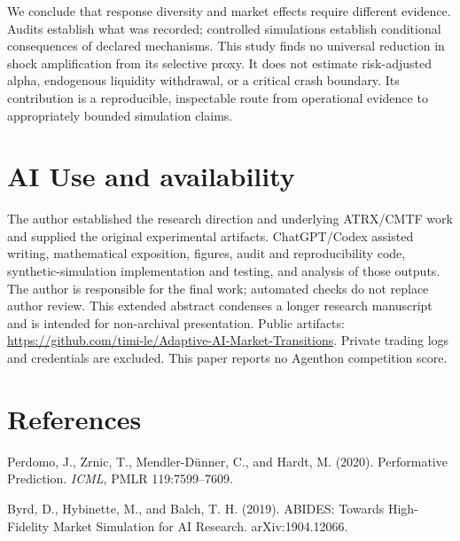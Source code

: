 \documentclass[10pt,letterpaper,twocolumn]{article}
\begin{document}
We conclude that response diversity and market effects require different evidence. Audits establish what was recorded; controlled simulations establish conditional consequences of declared mechanisms. This study finds no universal reduction in shock amplification from its selective proxy. It does not estimate risk-adjusted alpha, endogenous liquidity withdrawal, or a critical crash boundary. Its contribution is a reproducible, inspectable route from operational evidence to appropriately bounded simulation claims.

\section*{AI Use and availability}
The author established the research direction and underlying ATRX/CMTF work and supplied the original experimental artifacts. ChatGPT/Codex assisted writing, mathematical exposition, figures, audit and reproducibility code, synthetic-simulation implementation and testing, and analysis of those outputs. The author is responsible for the final work; automated checks do not replace author review. This extended abstract condenses a longer research manuscript and is intended for non-archival presentation. Public artifacts: \url{https://github.com/timi-le/Adaptive-AI-Market-Transitions}. Private trading logs and credentials are excluded. This paper reports no Agenthon competition score.

\section*{References}
\noindent [1] Perdomo, J., Zrnic, T., Mendler-D\"unner, C., and Hardt, M. (2020). Performative Prediction. \emph{ICML}, PMLR 119:7599--7609.

\noindent [2] Byrd, D., Hybinette, M., and Balch, T. H. (2019). ABIDES: Towards High-Fidelity Market Simulation for AI Research. arXiv:1904.12066.
\end{document}
